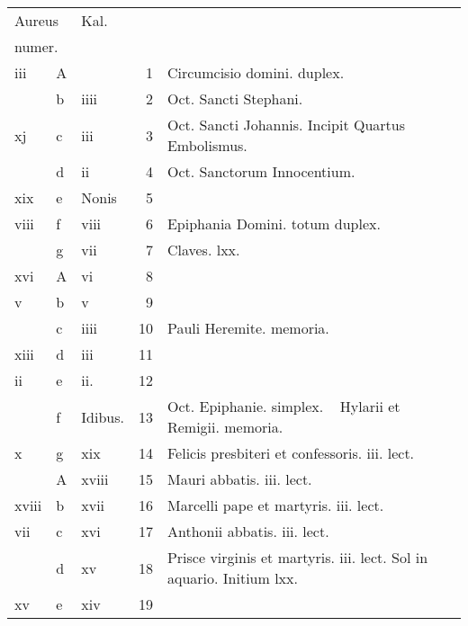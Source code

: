 \documentclass[openany]{book}
\begin{document}
\begin{center}
\begin{tabular}{l | l | l | r | l r}
\multicolumn{2}{l}{\color{Red}Aureus} & \color{Red} Kal. & & & \\
\multicolumn{2}{l}{\color{Red}numer.} & & & & \\
\color{Red} iii & \color{Red} A & & 1 & \color{Red} Circumcisio domini. \color{Red} duplex. \\
 & b & \color{Red} iiii & 2 & Oct. Sancti Stephani. & \color{Red} \\
\color{Red} xj & c & \color{Red} iii & 3 & Oct. Sancti Johannis. \qquad \color{Red} Incipit Quartus Embolismus.\\
& d & \color{Red} ii & 4 & \color{Red} Oct. Sanctorum Innocentium. & \color{Red} \\
\color{Red} xix & e & Nonis & 5 & & \color{Red} \\
\color{Red} viii & f & \color{Red} viii & 6 & Epiphania Domini. totum duplex. \\
 & g & \color{Red} vii & 7 & \qquad \color{Red} Claves. lxx. & \\
\color{Red} xvi & \color{Red} A & \color{Red} vi & 8 & & \\
\color{Red} v & b & \color{Red} v & 9 & & \\
 & c & \color{Red} iiii & 10 & Pauli Heremite. \color{Red} memoria. \\
\color{Red} xiii & d & \color{Red} iii & 11 & & \color{Red} \\
\color{Red} ii & e & \color{Red} ii. & 12 & & \color{Red} \\
 & f & Idibus. & 13 & Oct. Epiphanie. \color{Red} simplex. \ \color{black} Hylarii et Remigii. \color{Red} memoria. & \\
\color{Red} x & g & \color{Red} xix & 14 & Felicis presbiteri et confessoris. iii. lect. \\
 & \color{Red} A & \color{Red} xviii & 15 & \color{Red} Mauri abbatis. iii. lect. \\
\color{Red} xviii & b & \color{Red} xvii & 16 & Marcelli pape et martyris. iii. lect. \\
\color{Red} vii & c & \color{Red} xvi & 17 & \color{Red} Anthonii abbatis. iii. lect. \\
 & d & \color{Red} xv & 18 & Prisce virginis et martyris. iii. lect. \qquad \color{Red} Sol in aquario. Initium lxx. \\
\color{Red} xv & e & \color{Red} xiv & 19 & \color{Red} \\

\end{tabular}
\end{center}
\end{document}

